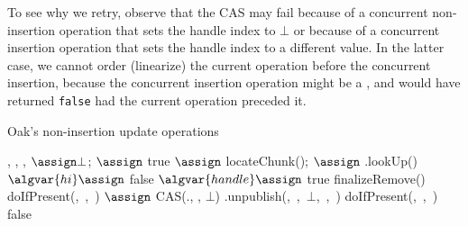 To see why we retry, observe that the CAS may fail because of a concurrent non-insertion operation that sets the handle index to $\bot$ or because of a concurrent insertion operation that sets the handle index to a different value.
In the latter case, we cannot order (linearize) the current operation before the concurrent insertion, because the concurrent insertion operation might be a , and would have returned \texttt{false} had the current operation preceded it.

\begin{algorithm*}[htb]
\small
\setlength\multicolsep{0pt}
\caption{Oak's non-insertion update operations}
\label{alg:doIfPresent}
\begin{algorithmic}[1]
\begin{multicols}{2}
\State {}, , ,  $\assign \bot$;  $\assign$ true
\State {} $\assign$ locateChunk(\key);  
{} $\assign$ .lookUp(\key)
  $\algvar{hi} \assign$ 
\EndIf
{} \Return false
\EndIf \label{line:doIfPresent hi is bot}
\State $\algvar{handle} \assign $
  \label{line:doIfPresent reads deleted}
  \label{line:doIfPresent handle compute return true}
\State \Return true
\EndIf
{} \label{line:doIfPresent handle remove}
\State \Return finalizeRemove()
\EndIf
\EndIf
{}
\State \Return doIfPresent(\key,\ ,\ )
\EndIf \label{line:doIfPresent publish}
\State {} $\assign$ CAS(., , $\bot$) \label{line:doIfPresent cas}
\State {}.unpublish(,\ ,\ $\bot$,\ ,\ )
\Return doIfPresent(\key,\ ,\ ) \label{line:doIfPresent retry}
\EndIf
\State \Return false \label{line:doIfPresent final return false}
\EndProcedure



\end{multicols}
\end{algorithmic}
\end{algorithm*}
